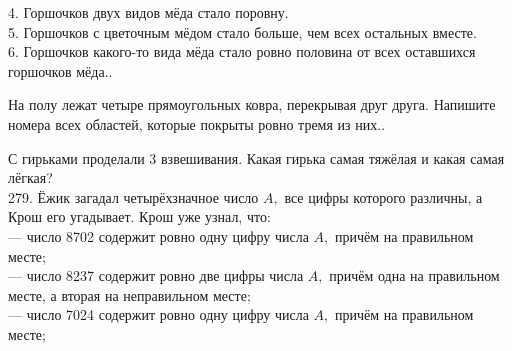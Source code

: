 \documentclass[12pt]{article}
\begin{document}
4. Горшочков двух видов мёда стало поровну.\\
5. Горшочков с цветочным мёдом стало больше, чем всех остальных вместе.\\
6. Горшочков какого-то вида мёда стало ровно половина от всех оставшихся горшочков мёда.\newpage{}. \begin{center}
\begin{figure}[ht!]
\end{figure}
\end{center}
На полу лежат четыре прямоугольных ковра, перекрывая друг друга. Напишите номера всех областей, которые покрыты ровно тремя из них.\newpage{}. \begin{center}
\begin{figure}[ht!]
\end{figure}
\end{center}
С гирьками проделали 3 взвешивания. Какая гирька самая тяжёлая и какая самая лёгкая?\\
279. Ёжик загадал четырёхзначное число $A,$ все цифры которого различны, а Крош его угадывает. Крош уже узнал, что:\\
 --- число 8702 содержит ровно одну цифру числа $A,$ причём на правильном месте;\\
 --- число 8237 содержит ровно две цифры числа $A,$ причём одна на правильном месте, а вторая на неправильном месте;\\
 --- число 7024 содержит ровно одну цифру числа $A,$ причём на правильном месте;\\
\end{document}
